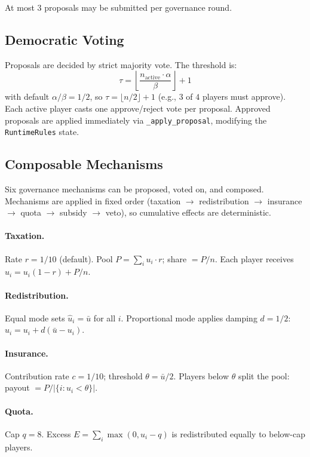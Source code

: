 At most $3$ proposals may be submitted per governance round.

\subsection{Democratic Voting}
\label{sec:voting}

Proposals are decided by strict majority vote. The threshold is:
\[
\tau = \left\lfloor \frac{n_{\text{active}} \cdot \alpha}{\beta} \right\rfloor + 1
\]
with default $\alpha/\beta = 1/2$, so $\tau = \lfloor n/2 \rfloor + 1$
(e.g., $3$ of $4$ players must approve). Each active player casts one
approve/reject vote per proposal. Approved proposals are applied immediately
via \texttt{\_apply\_proposal}, modifying the \texttt{RuntimeRules} state.

\subsection{Composable Mechanisms}
\label{sec:mechanisms}

Six governance mechanisms can be proposed, voted on, and composed.
Mechanisms are applied in fixed order (taxation $\to$ redistribution
$\to$ insurance $\to$ quota $\to$ subsidy $\to$ veto), so cumulative
effects are deterministic.

\paragraph{Taxation.} Rate $r = 1/10$ (default). Pool
$P = \sum_i u_i \cdot r$; share $= P / n$. Each player receives
$\hat{u}_i = u_i(1 - r) + P/n$.

\paragraph{Redistribution.} Equal mode sets $\hat{u}_i = \bar{u}$ for
all $i$. Proportional mode applies damping $d = 1/2$:
$\hat{u}_i = u_i + d(\bar{u} - u_i)$.

\paragraph{Insurance.} Contribution rate $c = 1/10$; threshold
$\theta = \bar{u}/2$. Players below $\theta$ split the pool:
payout $= P / |\{i : u_i < \theta\}|$.

\paragraph{Quota.} Cap $q = 8$. Excess $E = \sum_i \max(0, u_i - q)$
is redistributed equally to below-cap players.

